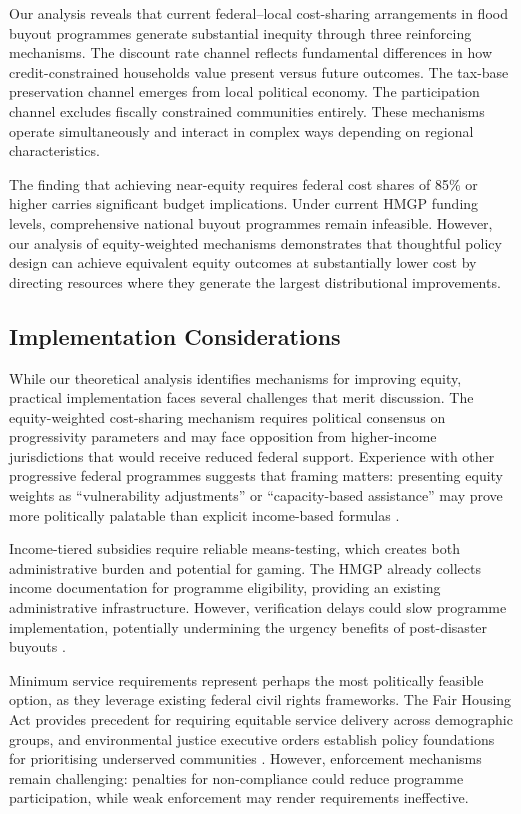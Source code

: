 \documentclass[12pt,a4paper]{article}
\begin{document}
Our analysis reveals that current federal--local cost-sharing arrangements in flood buyout programmes generate substantial inequity through three reinforcing mechanisms. The discount rate channel reflects fundamental differences in how credit-constrained households value present versus future outcomes. The tax-base preservation channel emerges from local political economy. The participation channel excludes fiscally constrained communities entirely. These mechanisms operate simultaneously and interact in complex ways depending on regional characteristics.

The finding that achieving near-equity requires federal cost shares of 85\% or higher carries significant budget implications. Under current HMGP funding levels, comprehensive national buyout programmes remain infeasible. However, our analysis of equity-weighted mechanisms demonstrates that thoughtful policy design can achieve equivalent equity outcomes at substantially lower cost by directing resources where they generate the largest distributional improvements.

\subsection{Implementation Considerations}

While our theoretical analysis identifies mechanisms for improving equity, practical implementation faces several challenges that merit discussion. The equity-weighted cost-sharing mechanism requires political consensus on progressivity parameters and may face opposition from higher-income jurisdictions that would receive reduced federal support. Experience with other progressive federal programmes suggests that framing matters: presenting equity weights as ``vulnerability adjustments'' or ``capacity-based assistance'' may prove more politically palatable than explicit income-based formulas \citep{banzhaf2019environmental}.

Income-tiered subsidies require reliable means-testing, which creates both administrative burden and potential for gaming. The HMGP already collects income documentation for programme eligibility, providing an existing administrative infrastructure. However, verification delays could slow programme implementation, potentially undermining the urgency benefits of post-disaster buyouts \citep{binder2016devil}.

Minimum service requirements represent perhaps the most politically feasible option, as they leverage existing federal civil rights frameworks. The Fair Housing Act provides precedent for requiring equitable service delivery across demographic groups, and environmental justice executive orders establish policy foundations for prioritising underserved communities \citep{bullard2005quest}. However, enforcement mechanisms remain challenging: penalties for non-compliance could reduce programme participation, while weak enforcement may render requirements ineffective.
\end{document}
